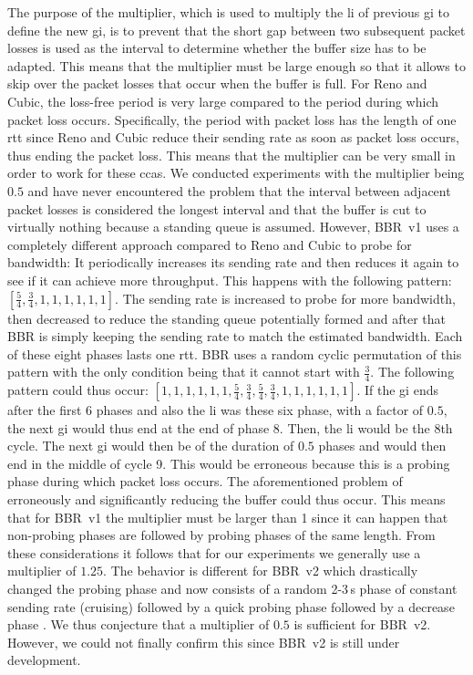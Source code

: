\documentclass[10pt,sigconf,letterpaper,dvipsnames\ifx\removeHeaders\tempYes ,nonacm\fi]{acmart}
\begin{document}
The purpose of the multiplier, which is used to multiply the \gls{li} of previous \gls{gi} to define the new \gls{gi}, is to prevent that the short gap between two subsequent packet losses is used as the interval to determine whether the buffer size has to be adapted. This means that the multiplier must be large enough so that it allows to skip over the packet losses that occur when the buffer is full. For Reno and Cubic, the loss-free period is very large compared to the period during which packet loss occurs. Specifically, the period with packet loss has the length of one \gls{rtt} since Reno and Cubic reduce their sending rate as soon as packet loss occurs, thus ending the packet loss. This means that the multiplier can be very small in order to work for these \glspl{cca}. We conducted experiments with the multiplier being $0.5$ and have never encountered the problem that the interval between adjacent packet losses is considered the longest interval and that the buffer is cut to virtually nothing because a standing queue is assumed. However, BBR~v1 uses a completely different approach compared to Reno and Cubic to probe for bandwidth: It periodically increases its sending rate and then reduces it again to see if it can achieve more throughput. This happens with the following pattern: $[\frac{5}{4},\frac{3}{4},1,1,1,1,1,1]$. The sending rate is increased to probe for more bandwidth, then decreased to reduce the standing queue potentially formed and after that BBR is simply keeping the sending rate to match the estimated bandwidth. Each of these eight phases lasts one \gls{rtt}. BBR uses a random cyclic permutation of this pattern with the only condition being that it cannot start with $\frac{3}{4}$. The following pattern could thus occur: $[1,1,1,1,1,1,\frac{5}{4},\frac{3}{4},\frac{5}{4},\frac{3}{4},1,1,1,1,1,1]$. If the \gls{gi} ends after the first 6 phases and also the \gls{li} was these six phase, with a factor of $0.5$, the next \gls{gi} would thus end at the end of phase 8. Then, the \gls{li} would be the 8th cycle. The next \gls{gi} would then be of the duration of $0.5$ phases and would then end in the middle of cycle 9. This would be erroneous because this is a probing phase during which packet loss occurs. The aforementioned problem of erroneously and significantly reducing the buffer could thus occur. This means that for BBR~v1 the multiplier must be larger than 1 since it can happen that non-probing phases are followed by probing phases of the same length. From these considerations it follows that for our experiments we generally use a multiplier of $1.25$. The behavior is different for BBR~v2 which drastically changed the probing phase and now consists of a random 2-3\,s phase of constant sending rate (cruising) followed by a quick probing phase followed by a decrease phase \cite{cardwell_bbr_2019-1,cardwell_bbr_2019}. We thus conjecture that a multiplier of $0.5$ is sufficient for BBR~v2. However, we could not finally confirm this since BBR~v2 is still under development. 
\end{document}
